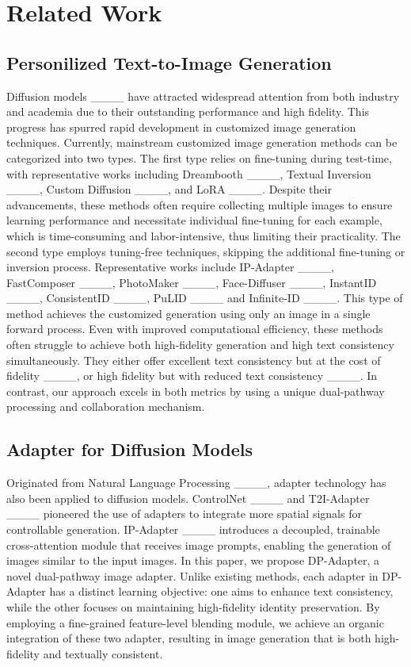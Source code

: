 \section{Related Work}
\subsection{Personilized Text-to-Image Generation} Diffusion models ____ have attracted widespread attention from both industry and academia due to their outstanding performance and high fidelity. This progress has spurred rapid development in customized image generation techniques. Currently, mainstream customized image generation methods can be categorized into two types. The first type relies on fine-tuning during test-time, with representative works including Dreambooth ____, Textual Inversion ____, Custom Diffusion ____, and LoRA ____. Despite their advancements, these methods often require collecting multiple images to ensure learning performance and necessitate individual fine-tuning for each example, which is time-consuming and labor-intensive, thus limiting their practicality. The second type employs tuning-free techniques, skipping the additional fine-tuning or inversion process. Representative works include IP-Adapter ____, FastComposer ____, PhotoMaker ____, Face-Diffuser ____, InstantID ____, ConsistentID  ____, PuLID ____ and Infinite-ID ____. This type of method achieves the customized generation using only an image in a single forward process. Even with improved computational efficiency, these methods often struggle to achieve both high-fidelity generation and high text consistency simultaneously. They either offer excellent text consistency but at the cost of fidelity ____, or high fidelity but with reduced text consistency ____. In contrast, our approach excels in both metrics by using a unique dual-pathway processing and collaboration mechanism.


\subsection{Adapter for Diffusion Models}
Originated from Natural Language Processing ____, adapter technology has also been applied to diffusion models. ControlNet ____ and T2I-Adapter ____ pioneered the use of adapters to integrate more spatial signals for controllable generation. IP-Adapter ____ introduces a decoupled, trainable cross-attention module that receives image prompts, enabling the generation of images similar to the input images. 
In this paper, we propose DP-Adapter, a novel dual-pathway image adapter. Unlike existing methods, each adapter in DP-Adapter has a distinct learning objective: one aims to enhance text consistency, while the other focuses on maintaining high-fidelity identity preservation. By employing a fine-grained feature-level blending module, we achieve an organic integration of these two adapter, resulting in image generation that is both high-fidelity and textually consistent.



